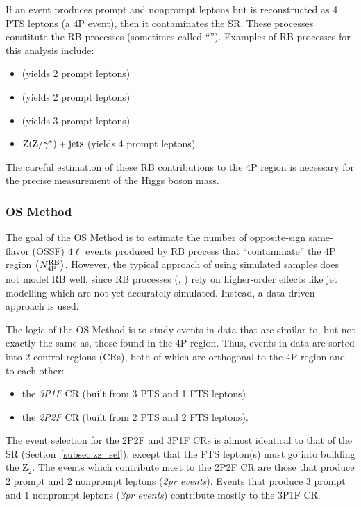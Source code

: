 If an event produces prompt and nonprompt leptons but is reconstructed as 4 PTS leptons (a 4P event), then it contaminates the SR.
These processes constitute the RB processes (sometimes called ``\ZplusX'').
Examples of RB processes for this analysis include:
\begin{itemize}
	\item \Zplusjets (yields 2 prompt leptons)
	\item \ttbarplusjets (yields 2 prompt leptons)
	\item \WZplusjets (yields 3 prompt leptons)
	\item $\mathrm{Z}(\mathrm{Z}/\gamma^*) + \text{jets}$ (yields 4 prompt leptons).
\end{itemize}
The careful estimation of these RB contributions to the 4P region is necessary for the precise measurement of the Higgs boson mass.

\subsubsection{OS Method}
The goal of the OS Method is to estimate the number of opposite-sign same-flavor (OSSF) $4\ell$ events produced by RB process that ``contaminate'' the 4P region $\left( N_{\mathrm{4P}}^{\mathrm{RB}} \right)$.
However, the typical approach of using simulated samples does not model RB well, since RB processes (\eg, \Zplusjets) rely on higher-order effects like jet modelling which are not yet accurately simulated.
Instead, a data-driven approach is used.

The logic of the OS Method is to study events in data that are similar to, but not exactly the same as, those found in the 4P region.
Thus, events in data are sorted into 2 control regions (CRs), both of which are orthogonal to the 4P region and to each other:
\begin{itemize}
	\item the \emph{3P1F} CR (built from 3 PTS and 1 FTS leptons)
	\item the \emph{2P2F} CR (built from 2 PTS and 2 FTS leptons).
\end{itemize}
The event selection for the 2P2F and 3P1F CRs is almost identical to that of the SR (Section~\ref{subsec:zz_sel}),
except that the FTS lepton(s) must go into building the Z$_{2}$.
The events which contribute most to the 2P2F CR are those that produce 2 prompt and 2 nonprompt leptons (\emph{2pr events}).
Events that produce 3 prompt and 1 nonprompt leptons (\emph{3pr events}) contribute mostly to the 3P1F CR.

